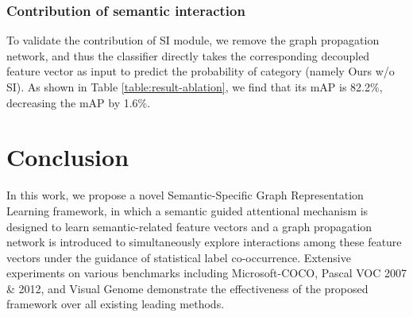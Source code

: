 \documentclass[10pt,twocolumn,letterpaper]{article}
\begin{document}
\subsubsection{Contribution of semantic interaction}
To validate the contribution of SI module, we remove the graph propagation network, and thus the classifier  directly takes the corresponding decoupled feature vector  as input to predict the probability of category  (namely Ours w/o SI). As shown in Table \ref{table:result-ablation}, we find that its mAP is 82.2\%, decreasing the mAP by 1.6\%.


\section{Conclusion}
In this work, we propose a novel Semantic-Specific Graph Representation Learning framework, in which a semantic guided attentional mechanism is designed to learn semantic-related feature vectors and a graph propagation network is introduced to simultaneously explore interactions among these feature vectors under the guidance of statistical label co-occurrence. Extensive experiments on various benchmarks including Microsoft-COCO, Pascal VOC 2007 \& 2012, and Visual Genome demonstrate the effectiveness of the proposed framework over all existing leading methods.


{\small


}
\end{document}
